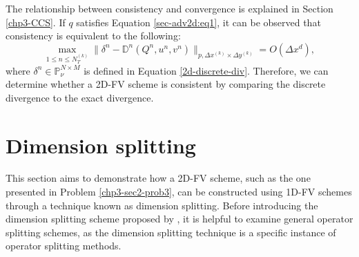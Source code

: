The relationship between consistency and convergence is explained in Section \ref{chp3-CCS}.
If $q$ satisfies Equation \eqref{sec-adv2d:eq1}, it can be observed that consistency is equivalent to the following:
\begin{equation*}
	{\max_{1\leq n\leq N_T^{(k)}}}{\|\delta^n - \mathbb{D}^n(Q^n,u^n,v^n)\|_{p,\Delta x^{(k)} \times \Delta y^{(k)}}} = O(\Delta x^d),
\end{equation*}
where $\delta^n \in \mathbb{P}^{N\times M}_{\nu}$ is defined in Equation \eqref{2d-discrete-div}.
Therefore, we can determine whether a 2D-FV scheme is consistent by comparing the discrete divergence to the exact divergence.

\section{Dimension splitting}
\label{sec-dsplit}
This section aims to demonstrate how a 2D-FV scheme, such as the one presented in Problem \ref{chp3-sec2-prob3},
can be constructed using 1D-FV schemes through a technique known as dimension splitting.
Before introducing the dimension splitting scheme proposed by \citet{lin:1996},
it is helpful to examine general operator splitting schemes,
as the dimension splitting technique is a specific instance of operator splitting methods.

